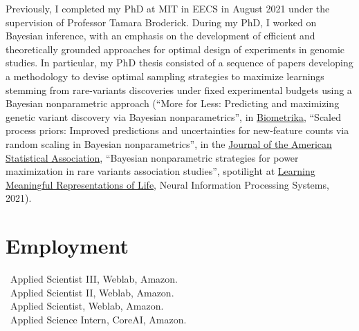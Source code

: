 \documentclass[10pt, a4paper]{article}
\newcommand{\years}[1]{\marginnote{\scriptsize #1}}
\begin{document}
Previously, I completed my PhD at MIT in EECS in August 2021 under the supervision of Professor Tamara Broderick. 
During my PhD, I worked on Bayesian inference, with an emphasis on the development of efficient and theoretically grounded approaches for optimal design of experiments in genomic studies. In particular, my PhD thesis consisted of a sequence of papers developing a methodology to devise optimal sampling strategies to maximize learnings stemming from rare-variants discoveries under fixed experimental budgets  using a Bayesian nonparametric approach (``{More for Less: Predicting and maximizing genetic variant discovery via Bayesian nonparametrics}'', in \href{https://academic.oup.com/biomet/advance-article-abstract/doi/10.1093/biomet/asab012/6146908?redirectedFrom=PDF}{Biometrika}, ``{Scaled process priors: Improved predictions and uncertainties for new-feature counts via random scaling in Bayesian nonparametrics}'', in the \href{https://www.tandfonline.com/doi/full/10.1080/01621459.2022.2115918}{Journal of the American Statistical Association},  ``{Bayesian nonparametric strategies for power maximization in rare variants association studies}'', spotilight at \href{https://www.lmrl.org/}{Learning Meaningful Representations of Life},  Neural Information Processing Systems, 2021).
%
\section*{Employment}
\noindent
\years{2024-}\ Applied Scientist III, Weblab, Amazon.\\
\years{2022-2023}\ Applied Scientist II, Weblab, Amazon.\\
\years{2021}\ Applied Scientist, Weblab, Amazon. \\
\years{2020}\ Applied Science Intern, CoreAI, Amazon. \\
\end{document}
